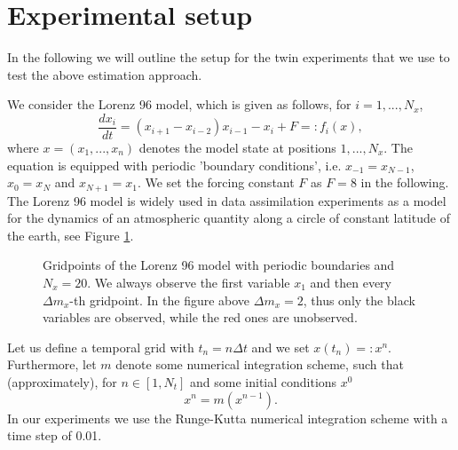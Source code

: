 \documentclass[a4paper,10pt]{article}
\numberwithin{equation}{section}
\begin{document}
\section{Experimental setup}
In the following we will outline the setup for the twin experiments that we use to test the above estimation approach. 

\medskip

 We consider the Lorenz 96 model, which is given as follows, for $i=1,...,N_x$,
 \begin{equation}
 \frac{dx_i}{dt}=(x_{i+1}-x_{i-2})x_{i-1}-x_i+F=:f_i(x),
 \end{equation}
 where $x=(x_1,...,x_n)$ denotes the model state at positions $1,...,N_x$. The equation is equipped with periodic 'boundary conditions', i.e. $x_{-1}=x_{N-1}$, $x_0=x_N$ and $x_{N+1}=x_1$. We set the forcing constant $F$ as  $F=8$ in the following. The Lorenz 96 model is widely used in data assimilation experiments as a model for the dynamics of an atmospheric quantity along a circle of constant latitude of the earth, see Figure \ref{fig:circle}. 
 
 
 
\newcommand{\equic}[2][1 cm]{
\draw (0,0) circle (#1);
\pgfmathparse{#1/1 cm+0.4};
\edef\oc{\pgfmathresult cm};
  \foreach \i in {1,3,5,7,9,11,13,15,17,19} {
    \coordinate (N\i) at (-\i*360/#2:#1);
    \fill[black] (N\i) circle (0.05 cm);
    \draw (-\i*360/#2:\oc) node{$x_{\i}$};
  }
    \foreach \i in {2,4,6,8,10,12,14,16,18,20}{
    \coordinate (N\i) at (-\i*360/#2:#1);
    \fill[red] (N\i) circle (0.05 cm);
    \draw(-\i*360/#2:\oc) node[color=red]{$x_{\i}$};
  }
}

\begin{figure}[H]
\centering
{}
\caption{Gridpoints of the Lorenz 96 model with periodic boundaries and $N_x=20$. We always observe the first variable $x_1$ and then every $\Delta m_x$-th gridpoint. In the figure above $\Delta m_x=2$, thus only the black variables are observed, while the red ones are unobserved. }
\label{fig:circle}
\end{figure}
    
 
 
 
Let us define a temporal grid with $t_n=n\Delta t$ and we set $x(t_n)=:x^n$. Furthermore, let $m$ denote some numerical integration scheme, such that (approximately), for $n\in[1,N_t]$ and some initial conditions $x^0$ 
 $$x^n=m(x^{n-1}).$$ 
 In our experiments we use the Runge-Kutta numerical integration scheme with a time step of 0.01. 
 
\end{document}
